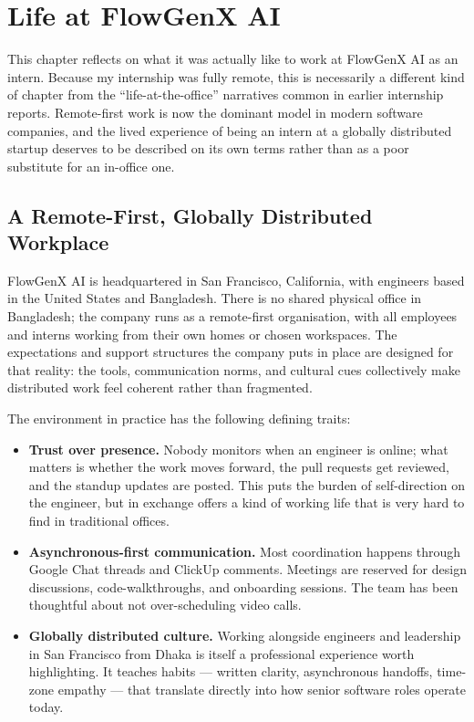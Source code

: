 \chapter{Life at FlowGenX AI}
\label{ch:life}

This chapter reflects on what it was actually like to work at
FlowGenX AI as an intern. Because my internship was fully remote,
this is necessarily a different kind of chapter from the
``life-at-the-office'' narratives common in earlier internship
reports. Remote-first work is now the dominant model in modern
software companies, and the lived experience of being an intern at
a globally distributed startup deserves to be described on its own
terms rather than as a poor substitute for an in-office one.

\section{A Remote-First, Globally Distributed Workplace}
FlowGenX AI is headquartered in San Francisco, California, with
engineers based in the United States and Bangladesh. There is no
shared physical office in Bangladesh; the company runs as a
remote-first organisation, with all employees and interns working
from their own homes or chosen workspaces. The expectations and
support structures the company puts in place are designed for that
reality: the tools, communication norms, and cultural cues
collectively make distributed work feel coherent rather than
fragmented.

The environment in practice has the following defining traits:

\begin{itemize}[leftmargin=*]
    \item \textbf{Trust over presence.} Nobody monitors when an
    engineer is online; what matters is whether the work moves
    forward, the pull requests get reviewed, and the standup updates
    are posted. This puts the burden of self-direction on the
    engineer, but in exchange offers a kind of working life that is
    very hard to find in traditional offices.

    \item \textbf{Asynchronous-first communication.} Most coordination
    happens through Google Chat threads and ClickUp comments. Meetings
    are reserved for design discussions, code-walkthroughs, and
    onboarding sessions. The team has been thoughtful about not
    over-scheduling video calls.

    \item \textbf{Globally distributed culture.} Working alongside
    engineers and leadership in San Francisco from Dhaka is itself a
    professional experience worth highlighting. It teaches habits ---
    written clarity, asynchronous handoffs, time-zone empathy ---
    that translate directly into how senior software roles operate
    today.
\end{itemize}

